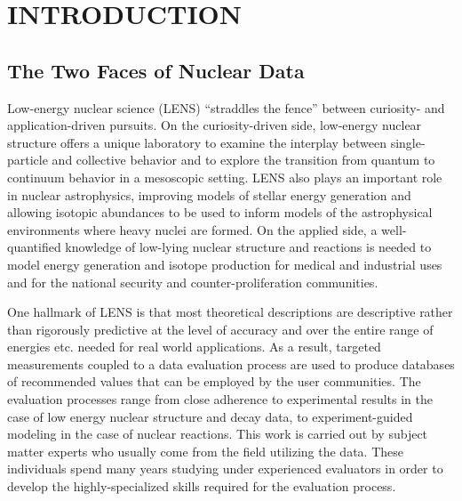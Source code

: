 \documentclass[letterpaper]{ar-1col}
\begin{document}
\tableofcontents


\section{INTRODUCTION}

\subsection{The Two Faces of Nuclear Data}


Low-energy nuclear science (LENS) \enquote{straddles the fence} between curiosity- and application-driven pursuits.
 On the curiosity-driven side, low-energy nuclear structure offers a unique laboratory to examine the interplay between single-particle and collective behavior and to explore the transition from quantum to continuum behavior in a mesoscopic setting.
LENS also plays an important role in nuclear astrophysics, improving models of stellar energy generation and allowing isotopic abundances to be used to inform models of the astrophysical environments where heavy nuclei are formed.
 On the applied side, a well-quantified knowledge of low-lying nuclear structure and reactions is needed to model energy generation and isotope production for medical and industrial uses and for the national security and counter-proliferation communities.
  

One hallmark of LENS is that most theoretical descriptions are descriptive rather than rigorously predictive at the level of accuracy and over the entire range of energies etc. needed for real world applications.
 As a result, targeted measurements coupled to a data evaluation process are used to produce databases of recommended values that can be employed by the user communities.
 The evaluation processes range from close adherence to experimental results in the case of low energy nuclear structure and decay data, to experiment-guided modeling in the case of nuclear reactions.
This work is carried out by subject matter experts who usually come from the field utilizing the data.  These individuals spend many years studying under experienced evaluators in order to develop the highly-specialized skills required for the evaluation process.
\end{document}
